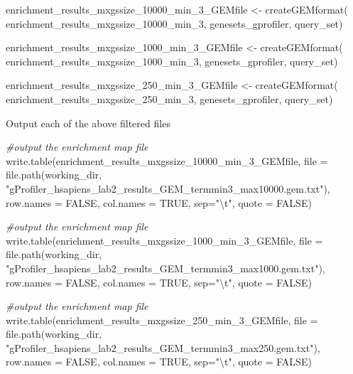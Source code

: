 \documentclass[
]{book}
\newenvironment{Shaded}{\begin{snugshade}}{\end{snugshade}}
\newcommand{\AttributeTok}[1]{\textcolor[rgb]{0.77,0.63,0.00}{#1}}
\newcommand{\CommentTok}[1]{\textcolor[rgb]{0.56,0.35,0.01}{\textit{#1}}}
\newcommand{\ConstantTok}[1]{\textcolor[rgb]{0.00,0.00,0.00}{#1}}
\newcommand{\FunctionTok}[1]{\textcolor[rgb]{0.00,0.00,0.00}{#1}}
\newcommand{\NormalTok}[1]{#1}
\newcommand{\OtherTok}[1]{\textcolor[rgb]{0.56,0.35,0.01}{#1}}
\newcommand{\SpecialCharTok}[1]{\textcolor[rgb]{0.00,0.00,0.00}{#1}}
\newcommand{\StringTok}[1]{\textcolor[rgb]{0.31,0.60,0.02}{#1}}
\begin{document}
\begin{Shaded}
\begin{Highlighting}[]
\NormalTok{enrichment\_results\_mxgssize\_10000\_min\_3\_GEMfile }\OtherTok{\textless{}{-}} \FunctionTok{createGEMformat}\NormalTok{(}
\NormalTok{  enrichment\_results\_mxgssize\_10000\_min\_3, genesets\_gprofiler, query\_set)}

\NormalTok{enrichment\_results\_mxgssize\_1000\_min\_3\_GEMfile }\OtherTok{\textless{}{-}} \FunctionTok{createGEMformat}\NormalTok{(}
\NormalTok{  enrichment\_results\_mxgssize\_1000\_min\_3, genesets\_gprofiler, query\_set)}

\NormalTok{enrichment\_results\_mxgssize\_250\_min\_3\_GEMfile }\OtherTok{\textless{}{-}} \FunctionTok{createGEMformat}\NormalTok{(}
\NormalTok{  enrichment\_results\_mxgssize\_250\_min\_3, genesets\_gprofiler, query\_set)}
\end{Highlighting}
\end{Shaded}

Output each of the above filtered files

\begin{Shaded}
\begin{Highlighting}[]
\CommentTok{\#output the enrichment map file}
\FunctionTok{write.table}\NormalTok{(enrichment\_results\_mxgssize\_10000\_min\_3\_GEMfile, }
            \AttributeTok{file =} \FunctionTok{file.path}\NormalTok{(working\_dir, }
                \StringTok{"gProfiler\_hsapiens\_lab2\_results\_GEM\_termmin3\_max10000.gem.txt"}\NormalTok{),}
            \AttributeTok{row.names =} \ConstantTok{FALSE}\NormalTok{, }
            \AttributeTok{col.names =} \ConstantTok{TRUE}\NormalTok{, }\AttributeTok{sep=}\StringTok{"}\SpecialCharTok{\textbackslash{}t}\StringTok{"}\NormalTok{,}
            \AttributeTok{quote =} \ConstantTok{FALSE}\NormalTok{)}

\CommentTok{\#output the enrichment map file}
\FunctionTok{write.table}\NormalTok{(enrichment\_results\_mxgssize\_1000\_min\_3\_GEMfile, }
            \AttributeTok{file =} \FunctionTok{file.path}\NormalTok{(working\_dir, }
                \StringTok{"gProfiler\_hsapiens\_lab2\_results\_GEM\_termmin3\_max1000.gem.txt"}\NormalTok{),}
            \AttributeTok{row.names =} \ConstantTok{FALSE}\NormalTok{, }
            \AttributeTok{col.names =} \ConstantTok{TRUE}\NormalTok{, }\AttributeTok{sep=}\StringTok{"}\SpecialCharTok{\textbackslash{}t}\StringTok{"}\NormalTok{,}
            \AttributeTok{quote =} \ConstantTok{FALSE}\NormalTok{)}

\CommentTok{\#output the enrichment map file}
\FunctionTok{write.table}\NormalTok{(enrichment\_results\_mxgssize\_250\_min\_3\_GEMfile, }
            \AttributeTok{file =} \FunctionTok{file.path}\NormalTok{(working\_dir, }
                \StringTok{"gProfiler\_hsapiens\_lab2\_results\_GEM\_termmin3\_max250.gem.txt"}\NormalTok{),}
            \AttributeTok{row.names =} \ConstantTok{FALSE}\NormalTok{, }
            \AttributeTok{col.names =} \ConstantTok{TRUE}\NormalTok{, }\AttributeTok{sep=}\StringTok{"}\SpecialCharTok{\textbackslash{}t}\StringTok{"}\NormalTok{,}
            \AttributeTok{quote =} \ConstantTok{FALSE}\NormalTok{)}
\end{Highlighting}
\end{Shaded}
\end{document}
